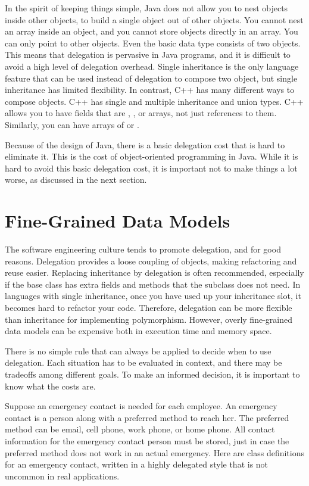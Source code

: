 In the spirit of keeping things simple, Java does not allow you to nest objects
inside other objects, to build a single object out of other objects. You cannot
nest an array inside an object, and you cannot store objects directly in an
array.  You can only point to other objects. Even the basic data type
 consists of two objects. This means that delegation is pervasive
in Java programs, and it is difficult to avoid a high level of delegation
overhead. Single inheritance is the only language feature that can be used
instead of delegation to compose two object, but single inheritance has limited
flexibility.  In contrast, C++ has many different ways to compose objects. C++
has single and multiple inheritance and union types. C++ allows you
to have fields that are , , or arrays, not just
references to them.  Similarly, you can have arrays of  or
.

Because of the design of Java, there is a basic delegation cost that is hard to eliminate it. This is the cost of object-oriented programming in Java. While it is hard to avoid this basic delegation cost, it is important not to make things a lot worse, as discussed in the next section. 

\section{Fine-Grained Data Models}
\label{fine-grained-data-models}

The software engineering culture tends to promote delegation, and for good reasons. Delegation provides a loose coupling of objects, making refactoring and reuse easier. Replacing inheritance by delegation is often recommended, especially if the base class has extra fields and methods that the subclass does not need. In languages with single inheritance, once you have used up your inheritance slot, it becomes hard to refactor your code. Therefore, delegation can be more flexible than inheritance for implementing polymorphism. However, overly fine-grained data models can be expensive both in execution time and memory space. 

There is no simple rule that can always be applied to decide when to use delegation. Each situation has to be evaluated in context, and there may be tradeoffs among different goals. To make an informed decision, it is important to know what the costs are.

Suppose an emergency contact is needed for each employee. An emergency contact is a person along with a preferred method to reach her.  The preferred method can be email, cell phone, work phone, or home phone. All contact information for the emergency contact person must be stored, just in case the preferred method does not work in an actual emergency. 
Here are class definitions for an emergency contact, written in a highly delegated style that is not uncommon in real applications. 

